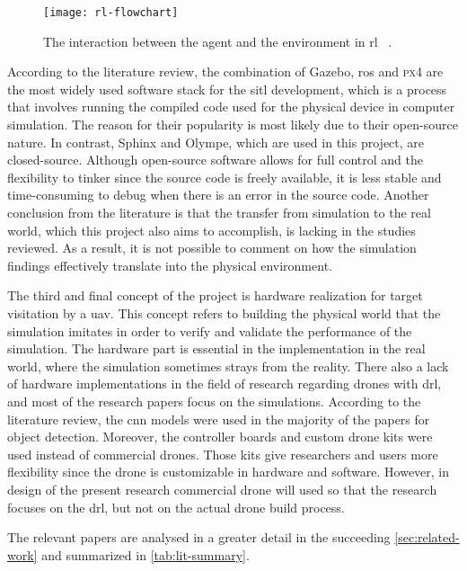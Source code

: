 \documentclass[../main.tex]{subfiles}
\begin{document}
\begin{figure}[tb] 
    \centering
    \texttt{[image: rl-flowchart]} 
    \caption{The interaction between the agent and the
        environment in \gls{rl}%
        ~\cite[Fig.~3.1]{Sut20}.} 
    \label{fig:rl-flowchart} 
\end{figure}

According to the literature review, 
the combination of Gazebo, \gls{ros}
and \textsc{px4} are the most widely used software stack 
for the \gls{sitl} development,
which is a process that involves running the compiled code
used for the physical device in computer simulation.
The reason for their popularity is most likely 
due to their open-source nature. 
In contrast, Sphinx and Olympe, which are used in this project, 
are closed-source.
Although open-source software 
allows for full control and the flexibility to tinker
since the source code is freely available,
it is less stable and time-consuming to debug
when there is an error in the source code.
Another conclusion from the literature is that 
the transfer from simulation to the real world,
which this project also aims to accomplish,
is lacking in the studies reviewed.
As a result, it is not possible to comment on 
how the simulation findings effectively translate
into the physical environment.

The third and final concept of the project 
is hardware realization for target visitation by a \gls{uav}.
This concept refers to building the physical world
that the simulation imitates in order to 
verify and validate the performance of the simulation.
The hardware part is essential in the implementation 
in the real world, where the simulation 
sometimes strays from the reality.
There also a lack of hardware implementations in 
the field of research regarding drones with \gls{drl}, 
and most of the research papers focus on the simulations.
According to the literature review, the \gls{cnn} 
models were used in the majority of the papers for object detection. 
Moreover, the controller boards and custom drone kits 
were used instead of commercial drones.
Those kits give researchers and users more flexibility 
since the drone is customizable 
in hardware and software. However, in design of the present research commercial drone will used so that the research focuses on the \gls{drl}, but not on the actual drone build process. 
 

The relevant papers are analysed in a greater detail in
the succeeding \cref{sec:related-work} 
and summarized in \cref{tab:lit-summary}.
\end{document}
